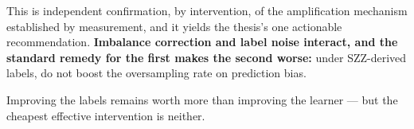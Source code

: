 This is independent confirmation, by intervention, of the amplification
mechanism established by measurement, and it yields the thesis's one
actionable recommendation. \textbf{Imbalance correction and label noise
interact, and the standard remedy for the first makes the second worse:}
under SZZ-derived labels, do not boost the oversampling rate on
prediction bias.

Improving the labels remains worth more than improving the learner ---
but the cheapest effective intervention is neither.
